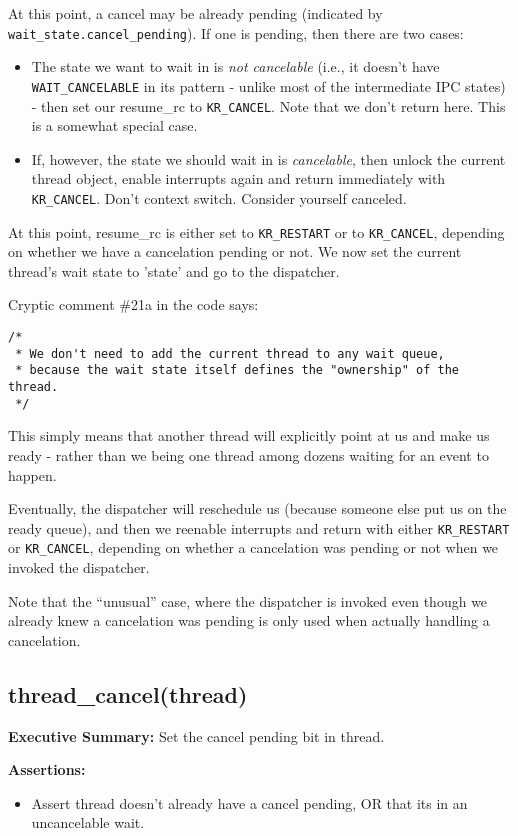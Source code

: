 At this point, a cancel may be already pending (indicated by
\texttt{wait_state.cancel_pending}). If one is pending, then there are
two cases:
\begin{itemize}
    \item The state we want to wait in is {\em not cancelable} (i.e.,
        it doesn't have \texttt{WAIT_CANCELABLE} in its pattern - unlike
        most of the intermediate IPC states) - then set our resume_rc
        to \texttt{KR_CANCEL}. Note that we don't return here.
        This is a somewhat special case.
    \item If, however, the state we should wait in is {\em cancelable},
        then unlock the current thread object, enable interrupts again
        and return immediately with \texttt{KR_CANCEL}.
        Don't context switch. Consider yourself canceled.
\end{itemize}
At this point, resume_rc is either set to \texttt{KR_RESTART} or
to \texttt{KR_CANCEL}, depending on whether we have a cancelation
pending or not. We now set the current thread's wait state to 'state'
and go to the dispatcher.

Cryptic comment \#21a in the code says:
\begin{verbatim}
/*
 * We don't need to add the current thread to any wait queue,
 * because the wait state itself defines the "ownership" of the thread.
 */
\end{verbatim}
This simply means that another thread will explicitly point at us and
make us ready - rather than we being one thread among dozens waiting
for an event to happen.

Eventually, the dispatcher will reschedule us (because someone else
put us on the ready queue), and then we reenable interrupts and return
with either \texttt{KR_RESTART} or \texttt{KR_CANCEL}, depending on
whether a cancelation was pending or not when we invoked the
dispatcher.

Note that the ``unusual'' case, where the dispatcher is invoked
even though we already knew a cancelation was pending is only used
when actually handling a cancelation.

\subsection{thread_cancel(thread)}

\textbf{Executive Summary:}  Set the cancel pending bit in thread.

\textbf{Assertions:}
\begin{itemize}
  \item Assert thread doesn't already have a cancel pending, OR
        that its in an uncancelable wait.
\end{itemize}

